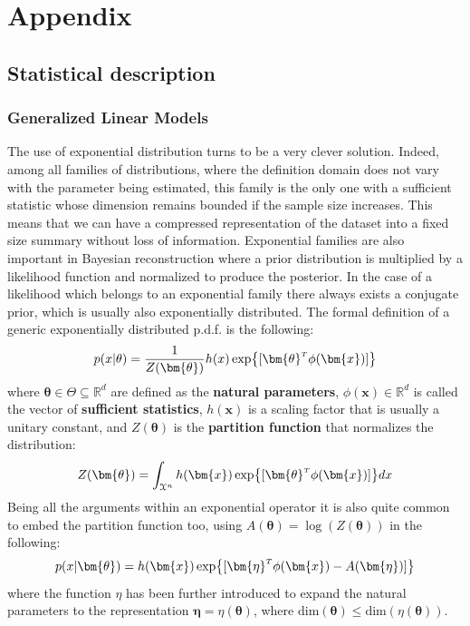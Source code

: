 \chapter{Appendix}



\section{Statistical description}

%
\subsection{Generalized Linear Models}

The use of exponential distribution turns to be a very clever solution. Indeed, among all families of distributions, where the definition domain does not vary with the parameter being estimated, this family is the only one with a sufficient statistic whose dimension remains bounded if the sample size increases. This means that we can have a compressed representation of the dataset into a fixed size summary without loss of information.
Exponential families are also important in Bayesian reconstruction where a prior distribution is multiplied by a likelihood function and normalized to produce the posterior. In the case of a likelihood which belongs to an exponential family there always exists a conjugate prior, which is usually also exponentially distributed. 
%
The formal definition of a generic exponentially distributed p.d.f. is the following:
\begin{equation}
    p(x|\theta) = \frac{1}{Z(\bm{\theta})}h(x) \exp{[\transpose{\bm{\theta}} \phi(\bm{x})]}
\end{equation}
where $\bm{\theta} \in \Theta \subseteq \mathbb{R}^d$ are defined as the \textbf{natural parameters}, $\phi(\bm{x}) \in \mathbb{R}^d$ is called the vector of \textbf{sufficient statistics}, $h(\bm{x})$ is a scaling factor that is usually a unitary constant, and $Z(\bm{\theta})$ is the \textbf{partition function} that normalizes the distribution:
\begin{equation}
    Z(\bm{\theta}) = 
    \int_{\mathcal{X}^n} h(\bm{x}) \exp{[\transpose{\bm{\theta}} \phi(\bm{x})]} dx
\end{equation}
Being all the arguments within an exponential operator it is also quite common to embed the partition function too, using $ A(\bm{\theta}) = \log\left(Z(\bm{\theta})\right)$ in the following:
\begin{equation}
    p(x|\bm{\theta}) = h(\bm{x}) \exp{[\transpose{\bm{\eta}}\phi(\bm{x}) - A(\bm{\eta}) ]}
\end{equation}
where the function $\eta$ has been further introduced to expand the natural parameters to the representation $\bm{\eta}=\eta(\bm{\theta})$, where $\text{dim}(\bm{\theta}) \leq \text{dim}\left(\eta(\bm{\theta})\right)$.


